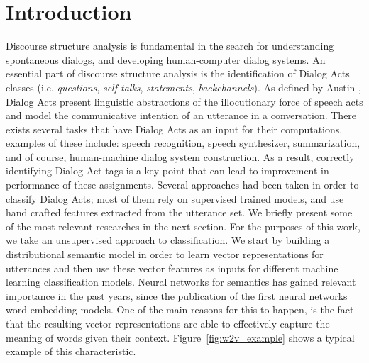\section{Introduction}\label{sec:intro}
Discourse structure analysis is fundamental in the search for understanding spontaneous dialogs, and developing human-computer dialog systems. An essential part of discourse structure analysis is the identification of Dialog Acts classes (i.e. \emph{questions}, \emph{self-talks}, \emph{statements}, \emph{backchannels}). As defined by Austin , Dialog Acts present linguistic abstractions of the illocutionary force of speech acts and model the communicative intention of an utterance in a conversation. There exists several tasks that have Dialog Acts as an input for their computations, examples of these include: speech recognition, speech synthesizer, summarization, and of course, human-machine dialog system construction. As a result, correctly identifying Dialog Act tags is a key point that can lead to improvement in performance of these assignments.
Several approaches had been taken in order to classify Dialog Acts; most of them rely on supervised trained models, and use hand crafted features extracted from the utterance set.  We briefly present some of the most relevant researches in the next section.
For the purposes of this work, we take an unsupervised approach to classification. We start by building a distributional semantic model in order to learn vector representations for utterances and then use these vector features as inputs for different machine learning classification models. Neural networks for semantics has gained relevant importance in the past years, since the publication of the first neural networks word embedding models. One of the main reasons for this to happen, is the fact that the resulting vector representations are able to effectively capture the meaning of words given their context. Figure~\ref{fig:w2v_example} shows a typical example of this characteristic.

